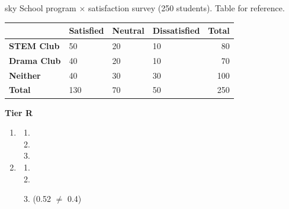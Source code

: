 \documentclass[10pt]{article}
\begin{document}
\namepartnerperiod

\vspace{0.1in}

\begin{scenariobox}[Context]{sky}
\small
School program $\times$ satisfaction survey (250 students). Table for reference.

\vspace{6pt}
\renewcommand{\arraystretch}{1.4}
\begin{tabularx}{\linewidth}{@{} l X X X r @{}}
 & \textbf{Satisfied} & \textbf{Neutral} & \textbf{Dissatisfied} & \textbf{Total} \\
\hline
\textbf{STEM Club}  & 50 & 20 & 10 & 80  \\
\textbf{Drama Club} & 40 & 20 & 10 & 70  \\
\textbf{Neither}    & 40 & 30 & 30 & 100 \\
\hline
\textbf{Total}      & 130 & 70 & 50 & 250 \\
\end{tabularx}
\end{scenariobox}

\vspace{0.1in}

\textbf{Tier R}
\begin{practicebox}
\small
\begin{enumerate}[leftmargin=1.5em, itemsep=6pt]
  \item
    \begin{enumerate}[label=(\alph*), itemsep=3pt]
      \item {}
      \item {}
      \item {} \quad {}
    \end{enumerate}

  \item
    \begin{enumerate}[label=(\alph*), itemsep=3pt]
      \item {}
      \item {}
      \item {} (0.52 $\neq$ 0.4)
    \end{enumerate}
\end{enumerate}
\end{practicebox}
\end{document}
